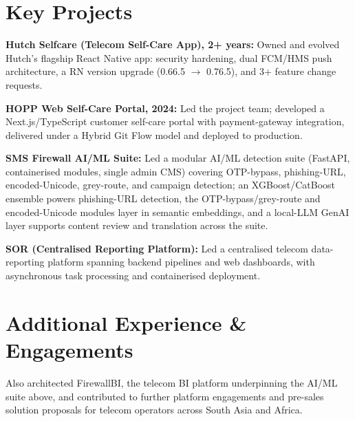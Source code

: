 \documentclass[10.5pt]{article}
\begin{document}
\section*{Key Projects}
\begin{cvitems}
  \item \textbf{Hutch Selfcare (Telecom Self-Care App), 2+ years:} Owned and evolved Hutch's flagship React Native app: security hardening, dual FCM/HMS push architecture, a RN version upgrade (0.66.5 $\rightarrow$ 0.76.5), and 3+ feature change requests.
  \item \textbf{HOPP Web Self-Care Portal, 2024:} Led the project team; developed a Next.js/TypeScript customer self-care portal with payment-gateway integration, delivered under a Hybrid Git Flow model and deployed to production.
  \item \textbf{SMS Firewall AI/ML Suite:} Led a modular AI/ML detection suite (FastAPI, containerised modules, single admin CMS) covering OTP-bypass, phishing-URL, encoded-Unicode, grey-route, and campaign detection; an XGBoost/CatBoost ensemble powers phishing-URL detection, the OTP-bypass/grey-route and encoded-Unicode modules layer in semantic embeddings, and a local-LLM GenAI layer supports content review and translation across the suite.
  \item \textbf{SOR (Centralised Reporting Platform):} Led a centralised telecom data-reporting platform spanning backend pipelines and web dashboards, with asynchronous task processing and containerised deployment.
\end{cvitems}

\section*{Additional Experience \& Engagements}
Also architected FirewallBI, the telecom BI platform underpinning the AI/ML suite above, and contributed to further platform engagements and pre-sales solution proposals for telecom operators across South Asia and Africa.
\end{document}
